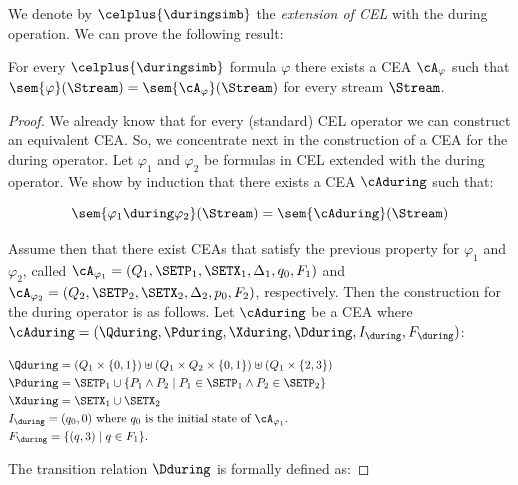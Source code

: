 We denote by $\celplus{\duringsimb}$ the \emph{extension of CEL} with the during operation. We can prove the following result:

\begin{theorem} \label{theo:mytheorem}
	For every $\celplus{\duringsimb}$ formula $\varphi$ there exists a CEA $\cA_\varphi$ such that $\sem{\varphi}(\Stream) = \sem{\cA_\varphi}(\Stream)$ for every stream $\Stream$.
\end{theorem}

\begin{proof}
	We already know that for every (standard) CEL operator we can construct an equivalent CEA. So, we concentrate next in the construction of a CEA for the during operator.
	Let $\varphi_1$ and $\varphi_2$ be formulas in CEL extended with the during operator. We show by induction that there exists a CEA $\cAduring$ such that:
	
	
	$$\sem{\varphi_1 \during \varphi_2}(\Stream) = \sem{\cAduring}(\Stream)$$
	
	
	Assume then that there exist CEAs that satisfy the previous property for $\varphi_1$ and $\varphi_2$, called $\cA_{\varphi_1} = (Q_1, \SETP_1, \SETX_1, \Delta_1, q_0, F_1)$ and $\cA_{\varphi_2} = (Q_2, \SETP_2, \SETX_2, \Delta_2, p_0, F_2)$, respectively.
	Then the construction for the during operator is as follows.
	Let $\cAduring$ be a CEA where $\cAduring = (\Qduring, \Pduring, \Xduring, \Dduring, I_{\during}, F_{\during})$:
	
	
	$$\begin{aligned}[t] 		
		& \Qduring = (Q_1 \times \{0, 1\}) \uplus (Q_1 \times Q_2 \times \{0, 1\}) \uplus (Q_1 \times \{2, 3\}) \\ 		
		& \Pduring = \SETP_1 \cup \{ P_1 \land P_2 \mid P_1 \in \SETP_1 \land P_2 \in \SETP_2 \} \hspace*{155px}\\ 		
		& \Xduring  = \SETX_1 \cup \SETX_2 \\ 		
		& I_{\during} = (q_0, 0) \text{ where } q_0 \text{ is the initial state of }\cA_{\varphi_1}.\\ 		
		& F_{\during} = \{ (q, 3) \mid q \in F_1 \}. 	\end{aligned}$$
	
	
	The transition relation $\Dduring$ is formally defined as:
	

\end{proof}
